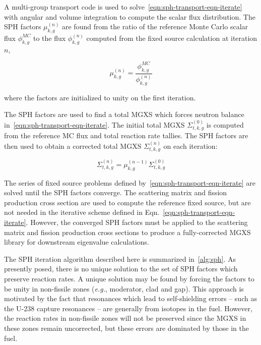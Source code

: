 \noindent A multi-group transport code is used to solve~\autoref{eqn:sph-transport-eqn-iterate} with angular and volume integration to compute the scalar flux distribution. The SPH factors $\mu_{k,g}^{(n)}$ are found from the ratio of the reference Monte Carlo scalar flux $\phi_{k,g}^{MC}$ to the flux $\phi_{k,g}^{(n)}$ computed from the fixed source calculation at iteration $n$,

\begin{equation}
\label{eqn:sph-update}
\mu_{k,g}^{(n)} = \frac{\phi_{k,g}^{MC}}{\phi_{k,g}^{(n)}}
\end{equation}

\noindent where the factors are initialized to unity on the first iteration.

The SPH factors are used to find a total MGXS which forces neutron balance in~\autoref{eqn:sph-transport-eqn-iterate}. The initial total MGXS $\Sigma_{t,k,g}^{(0)}$ is computed from the reference MC flux and total reaction rate tallies. The SPH factors are then used to obtain a corrected total MGXS $\Sigma_{t,k,g}^{(n)}$ on each iteration:

\begin{dmath}
\label{eqn:sph-update-sigt}
\Sigma_{t,k,g}^{(n)} = \mu_{k,g}^{(n-1)}\Sigma_{t,k,g}^{(0)}
\end{dmath}

The series of fixed source problems defined by~\autoref{eqn:sph-transport-eqn-iterate} are solved until the SPH factors converge. The scattering matrix and fission production cross section are used to compute the reference fixed source, but are not needed in the iterative scheme defined in Eqn.~\ref{eqn:sph-transport-eqn-iterate}. However, the converged SPH factors must be applied to the scattering matrix and fission production cross sections to produce a fully-corrected MGXS library for downstream eigenvalue calculations.

The SPH iteration algorithm described here is summarized in~\autoref{alg:sph}. As presently posed, there is no unique solution to the set of SPH factors which preserve reaction rates. A unique solution may be found by forcing the factors to be unity in non-fissile zones (\textit{e.g.}, moderator, clad and gap). This approach is motivated by the fact that resonances which lead to self-shielding errors -- such as the U-238 capture resonances -- are generally from isotopes in the fuel. However, the reaction rates in non-fissile zones will not be preserved since the MGXS in these zones remain uncorrected, but these errors are dominated by those in the fuel.

